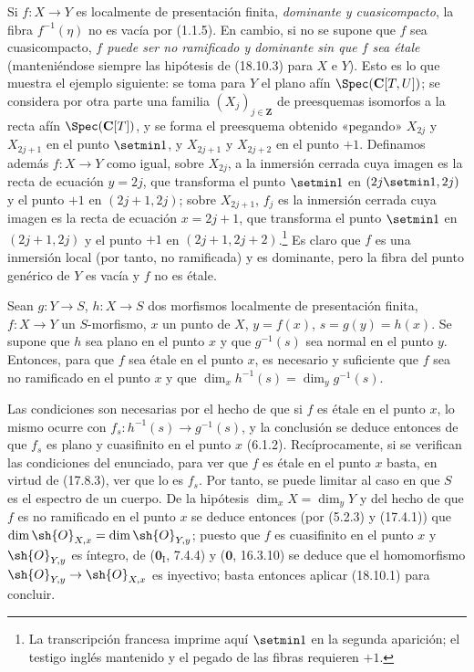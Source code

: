 
\begin{remark}[18.10.3.1]
\label{IV.18.10.3.1}
Si $f:X\to Y$ es localmente de presentación finita, \emph{dominante y cuasicompacto}, la fibra $f^{-1}(\eta)$ no es vacía por (1.1.5). En cambio, si no se supone que $f$ sea cuasicompacto, \emph{$f$ puede ser no ramificado y dominante sin que $f$ sea étale} (manteniéndose siempre las hipótesis de (18.10.3) para $X$ e $Y$). Esto es lo que muestra el ejemplo siguiente: se toma para $Y$ el plano afín $\Spec(\mathbf C[T,U])$; se considera por otra parte una familia $(X_j)_{j\in\mathbf Z}$ de preesquemas isomorfos a la recta afín $\Spec(\mathbf C[T])$, y se forma el preesquema obtenido «pegando» $X_{2j}$ y $X_{2j+1}$ en el punto $\setmin 1$, y $X_{2j+1}$ y $X_{2j+2}$ en el punto $+1$. Definamos además $f:X\to Y$ como igual, sobre $X_{2j}$, a la inmersión cerrada cuya imagen es la recta de ecuación $y=2j$, que transforma el punto $\setmin 1$ en $(2j\setmin 1,2j)$ y el punto $+1$ en $(2j+1,2j)$; sobre $X_{2j+1}$, $f_j$ es la inmersión cerrada cuya imagen es la recta de ecuación $x=2j+1$, que transforma el punto $\setmin 1$ en $(2j+1,2j)$ y el punto $+1$ en $(2j+1,2j+2)$.\footnote{La transcripción francesa imprime aquí $\setmin 1$ en la segunda aparición; el testigo inglés mantenido y el pegado de las fibras requieren $+1$.}
Es claro que $f$ es una inmersión local (por tanto, no ramificada) y es dominante, pero la fibra del punto genérico de $Y$ es vacía y $f$ no es étale.
\end{remark}

\begin{corollary}[18.10.4]
\label{IV.18.10.4}
Sean $g:Y\to S$, $h:X\to S$ dos morfismos localmente de presentación finita, $f:X\to Y$ un $S$-morfismo, $x$ un punto de $X$, $y=f(x)$, $s=g(y)=h(x)$. Se supone que $h$ sea \textup{plano} en el punto $x$ y que $g^{-1}(s)$ sea \textup{normal} en el punto $y$. Entonces, para que $f$ sea étale en el punto $x$, es necesario y suficiente que $f$ sea no ramificado en el punto $x$ y que $\dim_xh^{-1}(s)=\dim_yg^{-1}(s)$.
\end{corollary}

Las condiciones son necesarias por el hecho de que si $f$ es étale en el punto $x$, lo mismo ocurre con $f_s:h^{-1}(s)\to g^{-1}(s)$, y la conclusión se deduce entonces de que $f_s$ es plano y cuasifinito en el punto $x$ (6.1.2). Recíprocamente, si se verifican las condiciones del enunciado, para ver que $f$ es étale en el punto $x$ basta, en virtud de (17.8.3), ver que lo es $f_s$. Por tanto, se puede limitar al caso en que $S$ es el espectro de un cuerpo. De la hipótesis $\dim_xX=\dim_yY$ y del hecho de que $f$ es no ramificado en el punto $x$ se deduce entonces (por (5.2.3) y (17.4.1)) que $\dim\sh{O}_{X,x}=\dim\sh{O}_{Y,y}$; puesto que $f$ es cuasifinito en el punto $x$ y $\sh{O}_{Y,y}$ es íntegro, de ($\mathbf{0}_{\mathrm I}$, 7.4.4) y ($\mathbf{0}$, 16.3.10) se deduce que el homomorfismo $\sh{O}_{Y,y}\to\sh{O}_{X,x}$ es inyectivo; basta entonces aplicar (18.10.1) para concluir.

